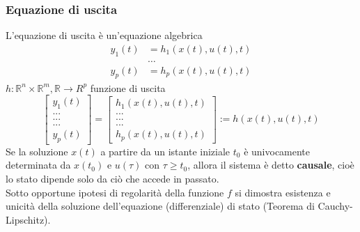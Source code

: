 \documentclass{article}
\begin{document}
\subsubsection{Equazione di uscita}
L'equazione di uscita è un'equazione algebrica
\begin{align*}
    y_1(t) &= h_1 \left(x(t), u(t), t\right)\\
    &\dots\\
    y_p (t) &= h_p \left(x(t), u(t), t\right)
\end{align*}
$h : \mathbb{R}^n \times \mathbb{R}^m , \mathbb{R} \rightarrow R^p$ funzione di uscita
\[
    \begin{bmatrix}
        y_1(t)\\
        ...\\
        ...\\
        ...\\
        y_p(t)
    \end{bmatrix} 
    =
    \begin{bmatrix}
        h_1\left(x(t),u(t),t\right)\\
        ...\\
        ...\\
        ...\\
        h_p\left(x(t),u(t),t\right)
    \end{bmatrix}
    := h\left(x(t),u(t),t\right)
\]
\vspace*{0.2cm}
Se la soluzione $x(t)$ a partire da un istante iniziale $t_0$ è univocamente determinata da $x(t_0)$ e $u(\tau)$ con $\tau \geq t_0$, allora il sistema è detto \textbf{causale}, cioè lo stato dipende solo da ciò che accede in passato.\\
Sotto opportune ipotesi di regolarità della funzione $f$ si dimostra esistenza e unicità della soluzione dell'equazione (differenziale) di stato (Teorema di Cauchy-Lipschitz).
\end{document}
